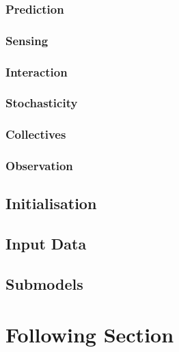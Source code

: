 \documentclass{article}
\begin{document}
\subsubsection{Prediction}

\subsubsection{Sensing}

\subsubsection{Interaction}

\subsubsection{Stochasticity}

\subsubsection{Collectives}

\subsubsection{Observation}

\subsection{Initialisation}

\subsection{Input Data}

\subsection{Submodels}

\section{Following Section}
\end{document}
